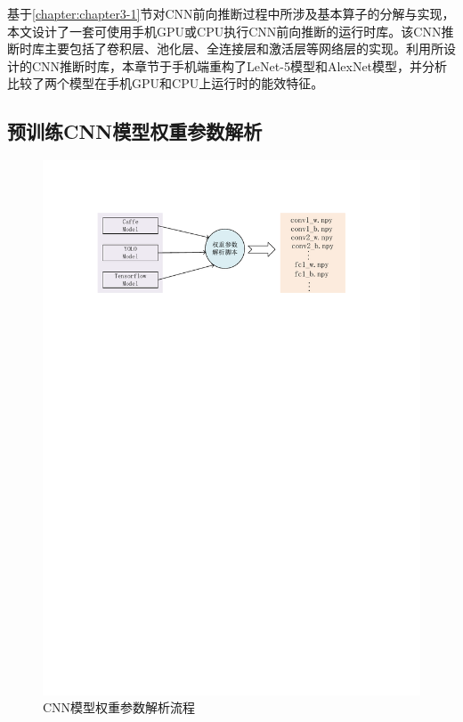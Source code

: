 基于\ref{chapter:chapter3-1}节对CNN前向推断过程中所涉及基本算子的分解与实现，本文设计了一套可使用手机GPU或CPU执行CNN前向推断的运行时库。该CNN推断时库主要包括了卷积层、池化层、全连接层和激活层等网络层的实现。利用所设计的CNN推断时库，本章节于手机端重构了LeNet-5模型和AlexNet模型，并分析比较了两个模型在手机GPU和CPU上运行时的能效特征。

\subsection{预训练CNN模型权重参数解析}
\label{chapter:chapter321}

\begin{figure}[htbp]
    \begin{center}
    \includegraphics{figures/weight.pdf}
    \end{center}
    \caption{CNN模型权重参数解析流程}\label{figure:figure14}
\end{figure}

